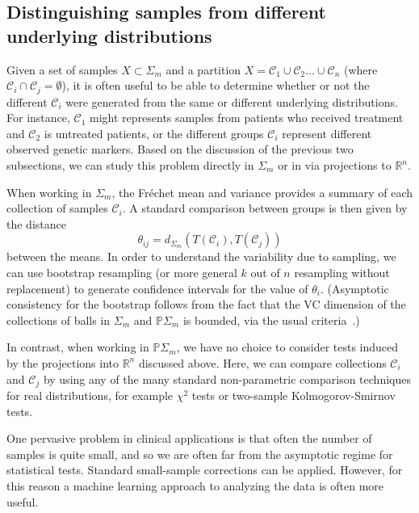 \documentclass[a4paper,11pt]{article}
\newcommand{\aC}{\mathcal{C}}
\begin{document}
\subsection{Distinguishing samples from different underlying distributions}

Given a set of samples $X \subset \Sigma_m$ and a partition $X = \aC_1 \cup \aC_2 \ldots \cup \aC_n$ (where $\aC_i \cap \aC_j = \emptyset$), it is often useful to be able to determine whether or not the different $\aC_i$ were generated from the same or different underlying distributions.
For instance, $\aC_1$ might represents samples from patients who received treatment and $\aC_2$ is untreated patients, or the different groups $\aC_i$ represent different observed genetic markers.
Based on the discussion of the previous two subsections, we can study this problem directly in $\Sigma_m$ or in via projections to $\mathbb{R}^n$.

When working in $\Sigma_m$, the Fr\'echet mean and variance provides a summary of each collection of samples $\aC_i$.
A standard comparison between groups is then given by the distance 
\[
\theta_{ij} = d_{\Sigma_m}(T(\aC_i), T(\aC_j))
\]
between the means.
In order to understand the variability due to sampling, we can use bootstrap resampling (or more general $k$ out of $n$ resampling without replacement) to generate confidence intervals for the value of $\theta_i$.
(Asymptotic consistency for the bootstrap follows from the fact that the VC dimension of the collections of balls in $\Sigma_m$ and $\mathbb{P}\Sigma_m$ is bounded, via the usual criteria~\cite{Gine1984, Gine1986, Gine1990}.) 


In contrast, when working in $\mathbb{P}\Sigma_m$, we have no choice to consider tests induced by the projections into $\mathbb{R}^n$ discussed above.
Here, we can compare collections $\aC_i$ and $\aC_j$ by using any of the many standard non-parametric comparison techniques for real distributions, for example $\chi^2$ tests or two-sample Kolmogorov-Smirnov tests.


One pervasive problem in clinical applications is that often the number of samples is quite small, and so we are often far from the asymptotic regime for statistical tests.
Standard small-sample corrections can be applied.
However, for this reason a machine learning approach to analyzing the data is often more useful.
\end{document}
